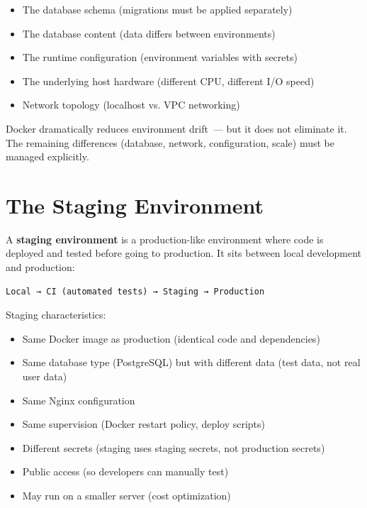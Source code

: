 \begin{itemize}
\tightlist
\item
  The database schema (migrations must be applied separately)
\item
  The database content (data differs between environments)
\item
  The runtime configuration (environment variables with secrets)
\item
  The underlying host hardware (different CPU, different I/O speed)
\item
  Network topology (localhost vs. VPC networking)
\end{itemize}

\noindent{}Docker dramatically reduces environment drift~--- but it does not eliminate it. The remaining differences (database, network, configuration, scale) must be managed explicitly.

\setcounter{section}{7}
\section{The Staging Environment}\label{39-local-vs-production:398-the-staging-environment}

A \textbf{staging environment} is a production-like environment where code is deployed and tested before going to production. It sits between local development and production:

\begin{outputbox}[short]
\begin{Verbatim}[fontsize=\codesize, breaklines, breakanywhere, breaksymbolleft={\tiny\textcolor{muted}{$\hookrightarrow$}}]
Local → CI (automated tests) → Staging → Production
\end{Verbatim}
\end{outputbox}

\noindent{}Staging characteristics:

\begin{itemize}
\tightlist
\item
  Same Docker image as production (identical code and dependencies)
\item
  Same database type (PostgreSQL) but with different data (test data, not real user data)
\item
  Same Nginx configuration
\item
  Same supervision (Docker restart policy, deploy scripts)
\item
  Different secrets (staging uses staging secrets, not production secrets)
\item
  Public access (so developers can manually test)
\item
  May run on a smaller server (cost optimization)
\end{itemize}

